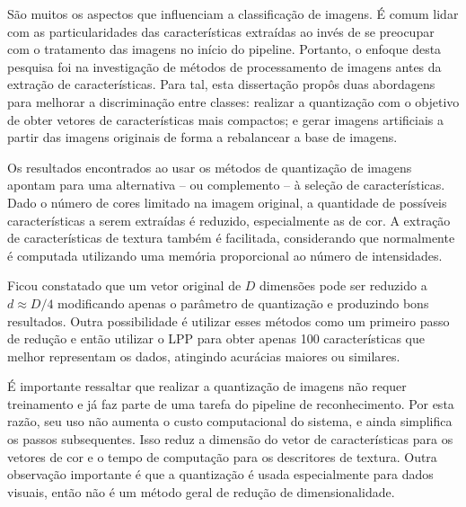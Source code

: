 
São muitos os aspectos que influenciam a classificação de imagens. É comum lidar com as particularidades das características extraídas ao invés de se preocupar com o tratamento das imagens no início do pipeline. Portanto, o enfoque desta pesquisa foi na investigação de métodos de processamento de imagens antes da extração de características. Para tal, esta dissertação propôs duas abordagens para melhorar a discriminação entre classes: realizar a quantização com o objetivo de obter vetores de características mais compactos; e gerar imagens artificiais a partir das imagens originais de forma a rebalancear a base de imagens.

Os resultados encontrados ao usar os métodos de quantização de imagens apontam para uma alternativa -- ou complemento -- à seleção de características. Dado o número de cores limitado na imagem original, a quantidade de possíveis características a serem extraídas é reduzido, especialmente as de cor. A extração de características de textura também é facilitada, considerando que normalmente é computada utilizando uma memória proporcional ao número de intensidades.

Ficou constatado que um vetor original de $D$ dimensões pode ser reduzido a $d \approx D/4$ modificando apenas o parâmetro de quantização e produzindo bons resultados. Outra possibilidade é utilizar esses métodos como um primeiro passo de redução e então utilizar o LPP para obter apenas 100 características que melhor representam os dados, atingindo acurácias maiores ou similares.

É importante ressaltar que realizar a quantização de imagens não requer treinamento e já faz parte de uma tarefa do pipeline de reconhecimento. Por esta razão, seu uso não aumenta o custo computacional do sistema, e ainda simplifica os passos subsequentes. Isso reduz a dimensão do vetor de características para os vetores de cor e o tempo de computação para os descritores de textura. Outra observação importante é que a quantização é usada especialmente para dados visuais, então não é um método geral de redução de dimensionalidade.

